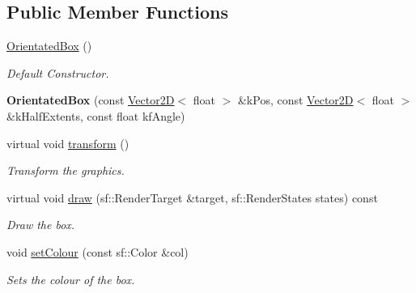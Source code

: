 \subsection*{Public Member Functions}
\begin{DoxyCompactItemize}
\item 
\hypertarget{class_orientated_box_a8ce9868a436dbbcd874d576dd25de2da}{\hyperlink{class_orientated_box_a8ce9868a436dbbcd874d576dd25de2da}{Orientated\+Box} ()}\label{class_orientated_box_a8ce9868a436dbbcd874d576dd25de2da}

\begin{DoxyCompactList}\small\item\em Default Constructor. \end{DoxyCompactList}\item 
\hypertarget{class_orientated_box_a9d33842f40fe272b541c4b95028da5ad}{{\bfseries Orientated\+Box} (const \hyperlink{class_vector2_d}{Vector2\+D}$<$ float $>$ \&k\+Pos, const \hyperlink{class_vector2_d}{Vector2\+D}$<$ float $>$ \&k\+Half\+Extents, const float kf\+Angle)}\label{class_orientated_box_a9d33842f40fe272b541c4b95028da5ad}

\item 
\hypertarget{class_orientated_box_ae1c39bcc43b31b0faf01c16dadc02d3b}{virtual void \hyperlink{class_orientated_box_ae1c39bcc43b31b0faf01c16dadc02d3b}{transform} ()}\label{class_orientated_box_ae1c39bcc43b31b0faf01c16dadc02d3b}

\begin{DoxyCompactList}\small\item\em Transform the graphics. \end{DoxyCompactList}\item 
virtual void \hyperlink{class_orientated_box_acf0c8800cd7024c9d346c33d299dc2cd}{draw} (sf\+::\+Render\+Target \&target, sf\+::\+Render\+States states) const 
\begin{DoxyCompactList}\small\item\em Draw the box. \end{DoxyCompactList}\item 
void \hyperlink{class_orientated_box_a8ddf109e746d64d0e40f7832b0d8533b}{set\+Colour} (const sf\+::\+Color \&col)
\begin{DoxyCompactList}\small\item\em Sets the colour of the box. \end{DoxyCompactList}\end{DoxyCompactItemize}
